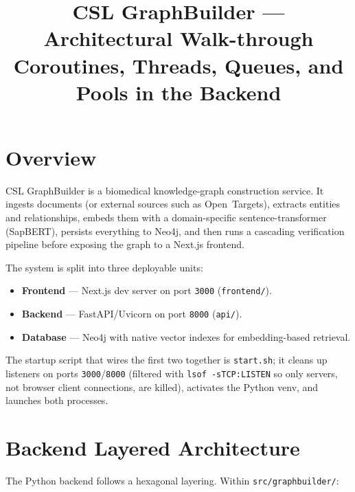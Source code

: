 \documentclass[11pt,a4paper]{article}
\title{\textbf{CSL GraphBuilder --- Architectural Walk-through}\\
  \large Coroutines, Threads, Queues, and Pools in the Backend}
\author{}
\date{}
\begin{document}
\maketitle

\section{Overview}

CSL GraphBuilder is a biomedical knowledge-graph construction service. It
ingests documents (or external sources such as Open~Targets), extracts
entities and relationships, embeds them with a domain-specific
sentence-transformer (SapBERT), persists everything to Neo4j, and then runs
a cascading verification pipeline before exposing the graph to a Next.js
frontend.

The system is split into three deployable units:

\begin{itemize}[leftmargin=*]
  \item \textbf{Frontend} --- Next.js dev server on port \texttt{3000}
        (\texttt{frontend/}).
  \item \textbf{Backend} --- FastAPI/Uvicorn on port \texttt{8000}
        (\texttt{api/}).
  \item \textbf{Database} --- Neo4j with native vector indexes for
        embedding-based retrieval.
\end{itemize}

The startup script that wires the first two together is
\texttt{start.sh}; it cleans up listeners on ports \texttt{3000}/\texttt{8000}
(filtered with \texttt{lsof -sTCP:LISTEN} so only servers, not browser
client connections, are killed), activates the Python venv, and launches
both processes.

\section{Backend Layered Architecture}

The Python backend follows a hexagonal layering. Within
\texttt{src/graphbuilder/}:
\end{document}
